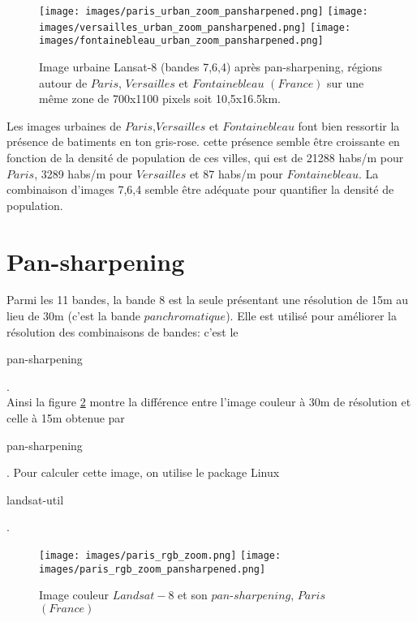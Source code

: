 \documentclass{book}
\begin{document}
\begin{figure}[H]
\begin{center}
\texttt{[image: images/paris\_urban\_zoom\_pansharpened.png]}
\texttt{[image: images/versailles\_urban\_zoom\_pansharpened.png]}
\texttt{[image: images/fontainebleau\_urban\_zoom\_pansharpened.png]}
\end{center}
\caption{Image urbaine Lansat-8 (bandes 7,6,4) après pan-sharpening, régions autour de $Paris$, $Versailles$ et $Fontainebleau$ $(France)$ sur une même zone de 700x1100 pixels soit 10,5x16.5km.}
\label{urban}
\end{figure}

\clearpage

Les images urbaines de $Paris$,$Versailles$ et $Fontainebleau$ font bien ressortir la présence de batiments en ton gris-rose. cette présence
semble être croissante en fonction de la densité de population de ces villes, qui est de 21288 habs/m pour $Paris$, 3289 habs/m
pour $Versailles$ et 87 habs/m pour $Fontainebleau$. La combinaison d'images 7,6,4 semble être adéquate pour quantifier la densité
de population.

\section{Pan-sharpening}

Parmi les 11 bandes, la bande 8 est la seule présentant une résolution de 15m au lieu de 30m (c'est la bande $panchromatique$). 
Elle est utilisé pour améliorer la résolution
des combinaisons de bandes: c'est le \begin{itshape}pan-sharpening\end{itshape}.\\
Ainsi la figure \ref{pan_sharpen} montre la différence entre l'image couleur à 30m de résolution et celle à 15m obtenue par \begin{itshape}pan-sharpening\end{itshape}.
Pour calculer cette image, on utilise le package Linux \begin{itshape}landsat-util\end{itshape} \cite{dans-gdal}.

\begin{figure}[H]
\begin{center}
\texttt{[image: images/paris\_rgb\_zoom.png]}
\texttt{[image: images/paris\_rgb\_zoom\_pansharpened.png]}
\end{center}
\caption{Image couleur $Landsat-8$ et son $pan$-$sharpening$, $Paris$ $(France)$}
\label{pan_sharpen}
\end{figure}
\end{document}
